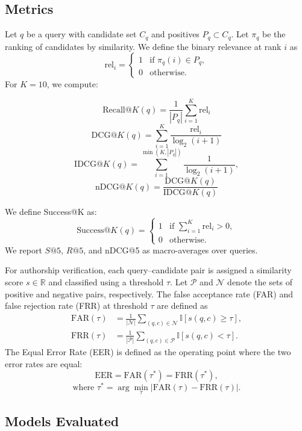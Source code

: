 \documentclass[11pt]{article}
\begin{document}
\subsection{Metrics}
\label{subsec:metrics}
Let $q$ be a query with candidate set $C_q$ and positives $P_q \subset C_q$.
Let $\pi_q$ be the ranking of candidates by similarity. We define the binary
relevance at rank $i$ as
\[
\mathrm{rel}_i =
\begin{cases}
1 & \text{if } \pi_q(i) \in P_q, \\
0 & \text{otherwise}.
\end{cases}
\]
For $K=10$, we compute:

\[
\mathrm{Recall@}K(q) = \frac{1}{|P_q|} \sum_{i=1}^{K} \mathrm{rel}_i
\]
\[
\mathrm{DCG@}K(q) = \sum_{i=1}^{K} \frac{\mathrm{rel}_i}{\log_2(i+1)}
\]
\[
\mathrm{IDCG@}K(q) = \sum_{i=1}^{\min(K,|P_q|)} \frac{1}{\log_2(i+1)},
\]
\[
\mathrm{nDCG@}K(q) = \frac{\mathrm{DCG@}K(q)}{\mathrm{IDCG@}K(q)}
\]

We define Success@K as:
\[
\mathrm{Success@}K(q) =
\begin{cases}
1 & \text{if } \sum_{i=1}^{K} \mathrm{rel}_i > 0, \\
0 & \text{otherwise}.
\end{cases}
\]
We report $S@5$, $R@5$, and nDCG@5 as macro-averages over queries.

For authorship verification, each query--candidate pair is assigned a similarity
score $s \in \mathbb{R}$ and classified using a threshold $\tau$.
Let $\mathcal{P}$ and $\mathcal{N}$ denote the sets of positive and negative pairs,
respectively. The false acceptance rate (FAR) and false rejection rate (FRR) at
threshold $\tau$ are defined as
\begin{align}
\mathrm{FAR}(\tau) &= \frac{1}{|\mathcal{N}|} \sum_{(q,c)\in\mathcal{N}} \mathbb{I}[s(q,c) \ge \tau], \\
\mathrm{FRR}(\tau) &= \frac{1}{|\mathcal{P}|} \sum_{(q,c)\in\mathcal{P}} \mathbb{I}[s(q,c) < \tau].
\end{align}
The Equal Error Rate (EER) is defined as the operating point where the two error
rates are equal:
\[
\mathrm{EER} = \mathrm{FAR}(\tau^\ast) = \mathrm{FRR}(\tau^\ast),
\]
\[
\text{where } \tau^\ast = \arg\min_{\tau} \left| \mathrm{FAR}(\tau) - \mathrm{FRR}(\tau) \right|.
\]

\subsection{Models Evaluated}
\label{subsec:models}
\end{document}
